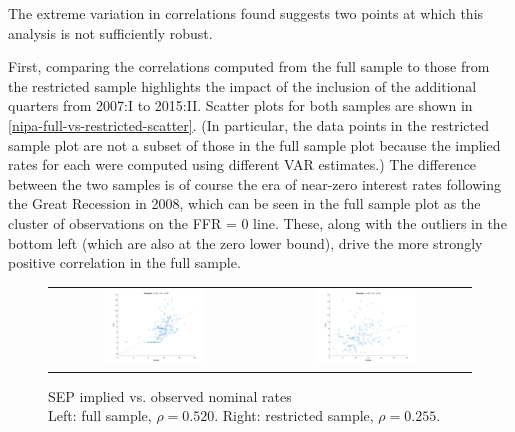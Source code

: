 The extreme variation in correlations found suggests two points at which this analysis is not sufficiently robust.

First, comparing the correlations computed from the full sample to those from the restricted sample highlights the impact of the inclusion of the additional quarters from 2007:I to 2015:II. Scatter plots for both samples are shown in \autoref{nipa-full-vs-restricted-scatter}. (In particular, the data points in the restricted sample plot are not a subset of those in the full sample plot because the implied rates for each were computed using different VAR estimates.) The difference between the two samples is of course the era of near-zero interest rates following the Great Recession in 2008, which can be seen in the full sample plot as the cluster of observations on the FFR = 0 line. These, along with the outliers in the bottom left (which are also at the zero lower bound), drive the more strongly positive correlation in the full sample.

\begin{figure}[t]
\centering
\captionsetup{singlelinecheck=false, justification=centering}
\caption{SEP implied vs. observed nominal rates \\ Left: full sample, $\rho = 0.520$. Right: restricted sample, $\rho = 0.255$.}
\label{nipa-full-vs-restricted-scatter}
\begin{tabular}{cc}
\includegraphics[width=0.5\textwidth]{figs/nipa/nominal_sep_scatter} &
\includegraphics[width=0.5\textwidth]{figs/nipa/nominal_sep_scatter_collard} \\
\end{tabular}
\end{figure}

